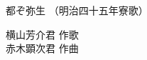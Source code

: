 \documentclass[10pt,b5j]{tarticle} %
\begin{document}
\begin{minipage}[c]{0.7\hsize} %
    \begin{center}
        {\LARGE
            都ぞ弥生 %
        }
        {\small 
            （明治四十五年寮歌） %
        }
    \end{center}
\end{minipage}
\begin{minipage}[c]{0.3\hsize} %
    \begin{flushright} %
        横山芳介君 作歌\\赤木顕次君 作曲 %
    \end{flushright}
\end{minipage}
\end{document}
